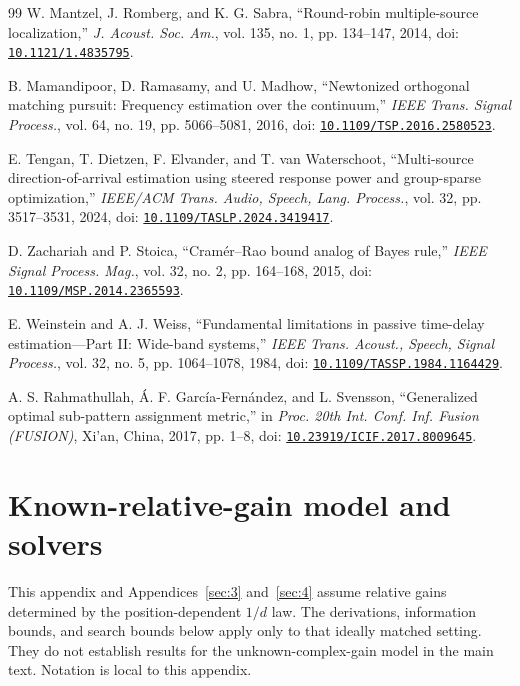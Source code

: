 \documentclass[11pt,a4paper]{article}
\numberwithin{equation}{section}
\numberwithin{figure}{section}
\numberwithin{table}{section}
\begin{document}
\begin{thebibliography}{99}
W. Mantzel, J. Romberg, and K. G. Sabra, ``Round-robin multiple-source localization,'' \emph{J. Acoust. Soc. Am.}, vol. 135, no. 1, pp. 134--147, 2014, doi: \href{https://doi.org/10.1121/1.4835795}{\nolinkurl{10.1121/1.4835795}}.

B. Mamandipoor, D. Ramasamy, and U. Madhow, ``Newtonized orthogonal matching pursuit: Frequency estimation over the continuum,'' \emph{IEEE Trans. Signal Process.}, vol. 64, no. 19, pp. 5066--5081, 2016, doi: \href{https://doi.org/10.1109/TSP.2016.2580523}{\nolinkurl{10.1109/TSP.2016.2580523}}.

E. Tengan, T. Dietzen, F. Elvander, and T. van Waterschoot, ``Multi-source direction-of-arrival estimation using steered response power and group-sparse optimization,'' \emph{IEEE/ACM Trans. Audio, Speech, Lang. Process.}, vol. 32, pp. 3517--3531, 2024, doi: \href{https://doi.org/10.1109/TASLP.2024.3419417}{\nolinkurl{10.1109/TASLP.2024.3419417}}.

D. Zachariah and P. Stoica, ``Cramér--Rao bound analog of Bayes rule,'' \emph{IEEE Signal Process. Mag.}, vol. 32, no. 2, pp. 164--168, 2015, doi: \href{https://doi.org/10.1109/MSP.2014.2365593}{\nolinkurl{10.1109/MSP.2014.2365593}}.

E. Weinstein and A. J. Weiss, ``Fundamental limitations in passive time-delay estimation---Part II: Wide-band systems,'' \emph{IEEE Trans. Acoust., Speech, Signal Process.}, vol. 32, no. 5, pp. 1064--1078, 1984, doi: \href{https://doi.org/10.1109/TASSP.1984.1164429}{\nolinkurl{10.1109/TASSP.1984.1164429}}.

A. S. Rahmathullah, Á. F. García-Fernández, and L. Svensson, ``Generalized optimal sub-pattern assignment metric,'' in \emph{Proc. 20th Int. Conf. Inf. Fusion (FUSION)}, Xi'an, China, 2017, pp. 1--8, doi: \href{https://doi.org/10.23919/ICIF.2017.8009645}{\nolinkurl{10.23919/ICIF.2017.8009645}}.
\end{thebibliography}

\clearpage
\appendix
\section{Known-relative-gain model and solvers}\label{sec:2}

This appendix and Appendices~\ref{sec:3} and~\ref{sec:4} assume relative gains determined by the position-dependent $1/d$ law. The derivations, information bounds, and search bounds below apply only to that ideally matched setting. They do not establish results for the unknown-complex-gain model in the main text. Notation is local to this appendix.
\end{document}
